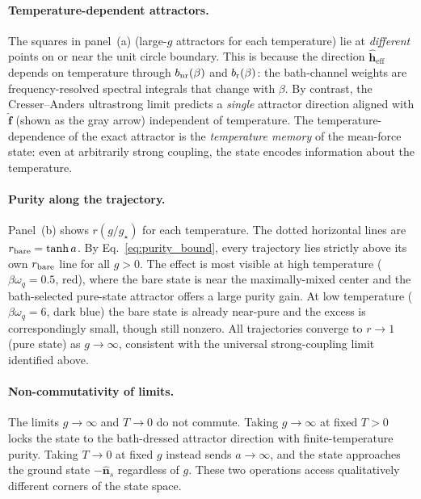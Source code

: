 \paragraph{Temperature-dependent attractors.}
The squares in panel~(a) (large-$g$ attractors for each temperature) lie at
\emph{different} points on or near the unit circle boundary.  This is because
the direction $\hat{\mathbf h}_{\mathrm{eff}}$ depends on temperature through
$b_{\rm nr}(\beta)$ and $b_{\rm r}(\beta)$: the bath-channel weights are
frequency-resolved spectral integrals that change with $\beta$.  By contrast,
the Cresser--Anders ultrastrong limit predicts a \emph{single} attractor
direction aligned with $\hat{\mathbf f}$ (shown as the gray arrow) independent
of temperature.  The temperature-dependence of the exact attractor is the
\emph{temperature memory} of the mean-force state: even at arbitrarily strong
coupling, the state encodes information about the temperature.

\paragraph{Purity along the trajectory.}
Panel~(b) shows $r(g/g_\star)$ for each temperature.  The dotted horizontal
lines are $r_{\rm bare} = \tanh a$.  By Eq.~\eqref{eq:purity_bound}, every
trajectory lies strictly above its own $r_{\rm bare}$ line for all $g > 0$.
The effect is most visible at high temperature ($\beta\omega_q=0.5$, red),
where the bare state is near the maximally-mixed center and the bath-selected
pure-state attractor offers a large purity gain.  At low temperature
($\beta\omega_q=6$, dark blue) the bare state is already near-pure and the
excess is correspondingly small, though still nonzero.  All trajectories
converge to $r\to 1$ (pure state) as $g\to\infty$, consistent with the
universal strong-coupling limit identified above.

\paragraph{Non-commutativity of limits.}
The limits $g\to\infty$ and $T\to 0$ do not commute.  Taking $g\to\infty$ at
fixed $T > 0$ locks the state to the bath-dressed attractor direction with
finite-temperature purity.  Taking $T\to 0$ at fixed $g$ instead sends
$a\to\infty$, and the state approaches the ground state $-\hat{\mathbf{n}}_s$
regardless of $g$.  These two operations access qualitatively different corners
of the state space.


